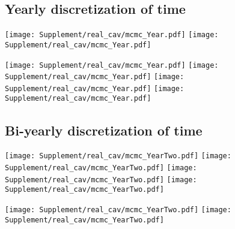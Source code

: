 \documentclass{article}
\begin{document}
\subsection*{Yearly discretization of time}
\begin{center}
    \texttt{[image: Supplement/real\_cav/mcmc\_Year.pdf]}
    \texttt{[image: Supplement/real\_cav/mcmc\_Year.pdf]}
\end{center}
\begin{center}
    \texttt{[image: Supplement/real\_cav/mcmc\_Year.pdf]}
    \texttt{[image: Supplement/real\_cav/mcmc\_Year.pdf]}
    \texttt{[image: Supplement/real\_cav/mcmc\_Year.pdf]}
    \texttt{[image: Supplement/real\_cav/mcmc\_Year.pdf]}
\end{center}

\subsection*{Bi-yearly discretization of time}
\begin{center}
    \texttt{[image: Supplement/real\_cav/mcmc\_YearTwo.pdf]}
    \texttt{[image: Supplement/real\_cav/mcmc\_YearTwo.pdf]}
    \texttt{[image: Supplement/real\_cav/mcmc\_YearTwo.pdf]}
    \texttt{[image: Supplement/real\_cav/mcmc\_YearTwo.pdf]}
\end{center}
\begin{center}
    \texttt{[image: Supplement/real\_cav/mcmc\_YearTwo.pdf]}
    \texttt{[image: Supplement/real\_cav/mcmc\_YearTwo.pdf]}
\end{center}
\end{document}
